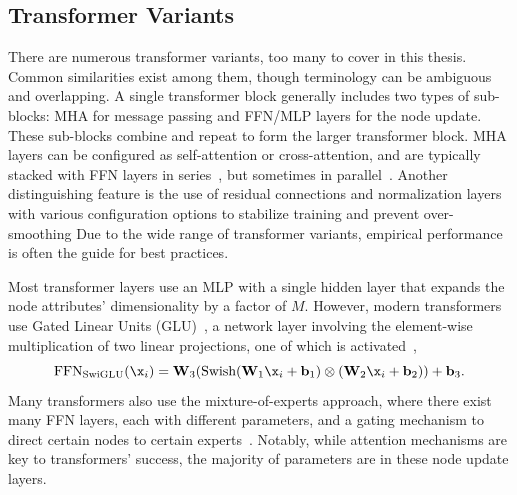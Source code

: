 
\subsection{Transformer Variants}

There are numerous transformer variants, too many to cover in this thesis.
Common similarities exist among them, though terminology can be ambiguous and overlapping.
A single transformer block generally includes two types of sub-blocks: MHA for message passing and FFN/MLP layers for the node update.
These sub-blocks combine and repeat to form the larger transformer block.
MHA layers can be configured as self-attention or cross-attention, and are typically stacked with FFN layers in series~\cite{Attention}, but sometimes in parallel~\cite{Palm}.
Another distinguishing feature is the use of residual connections and normalization layers with various configuration options to stabilize training and prevent over-smoothing
Due to the wide range of transformer variants, empirical performance is often the guide for best practices.

Most transformer layers use an MLP with a single hidden layer that expands the node attributes' dimensionality by a factor of $M$.
However, modern transformers use Gated Linear Units (GLU)~\cite{GLU}, a network layer involving the element-wise multiplication of two linear projections, one of which is activated~\cite{SwiGLU},
\begin{equation}
    \text{FFN}_\text{SwiGLU}(\x_i) = \mathbf{W}_3(\text{Swish}(\mathbf{W}_1 \x_i + \mathbf{b}_1) \otimes (\mathbf{W}_2 \x_i + \mathbf{b}_2)) + \mathbf{b}_3.
\end{equation}
Many transformers also use the mixture-of-experts approach, where there exist many FFN layers, each with different parameters, and a gating mechanism to direct certain nodes to certain experts~\cite{MOE}.
Notably, while attention mechanisms are key to transformers' success, the majority of parameters are in these node update layers.

